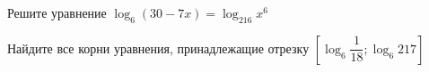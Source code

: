 \begin{ex}
	\begin{condition}
		\begin{enumcols}[label=\asbuk*)]
			\item Решите уравнение \( \log_6 (30-7x) = \log_{216} x^6 \)
			\item Найдите все корни уравнения, принадлежащие отрезку \(\left[\log_6 \dfrac{1}{18};\log_6 217\right]  \)
		\end{enumcols}
	\end{condition}
\end{ex}